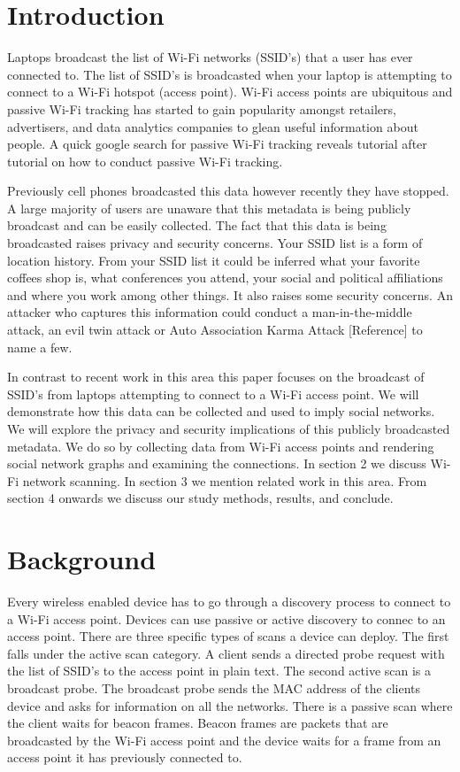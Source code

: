 \documentclass[letterpaper,twocolumn,10pt]{article}
\begin{document}
\section{Introduction}
Laptops broadcast the list of Wi-Fi networks (SSID's) that a user has ever connected to. The list of SSID's is broadcasted when your laptop is attempting to connect to a Wi-Fi hotspot (access point). Wi-Fi access points are ubiquitous and passive Wi-Fi tracking has started to gain popularity amongst retailers, advertisers, and data analytics companies to glean useful information about people. A quick google search for passive Wi-Fi tracking reveals tutorial after tutorial on how to conduct passive Wi-Fi tracking. 

Previously cell phones broadcasted this data however recently they have stopped. A large majority of users are unaware that this metadata is being publicly broadcast and can be easily collected. The fact that this data is being broadcasted raises privacy and security concerns. Your SSID list is a form of location history. From your SSID list it could be inferred what your favorite coffees shop is, what conferences you attend, your social and political affiliations and where you work among other things. It also raises some security concerns. An attacker who captures this information could conduct a man-in-the-middle attack, an evil twin attack or Auto Association Karma Attack [Reference] to name a few. 

In contrast to recent work in this area this paper focuses on the broadcast of SSID's from laptops attempting to connect to a Wi-Fi access point. We will demonstrate how this data can be collected and used to imply social networks. We will explore the privacy and security implications of this publicly broadcasted metadata. We do so by collecting data from Wi-Fi access points and rendering social network graphs and examining the connections. In section 2 we discuss Wi-Fi network scanning. In section 3 we mention related work in this area. From section 4 onwards we discuss our study methods, results, and conclude.



\section{Background}
Every wireless enabled device has to go through a discovery process to connect to a Wi-Fi access point. Devices can use passive or active discovery to connec to an access point. There are three specific types of scans a device can deploy. The first falls under the active scan category. A client sends a directed probe request with the list of SSID's to the access point in plain text. The second active scan is a broadcast probe. The broadcast probe  sends the MAC address of the clients device and asks for information on all the networks. There is a passive scan where the client waits for beacon frames. Beacon frames are packets that are broadcasted by the Wi-Fi access point and the device waits for a frame from an access point it has previously connected to. 
\end{document}
